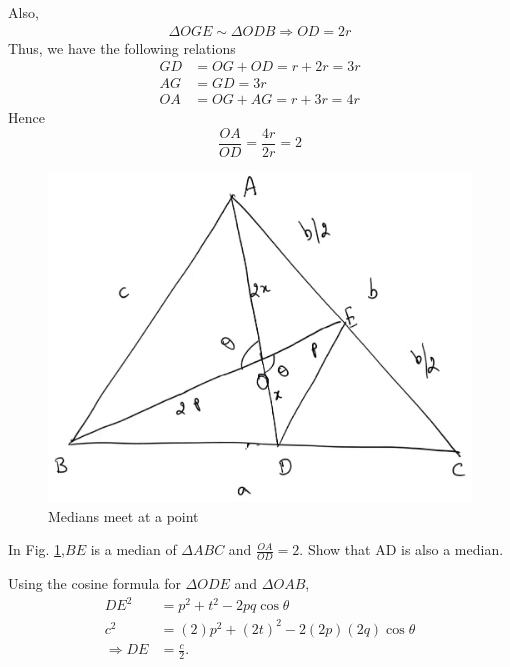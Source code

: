 %
Also,
\begin{align}
\Delta OGE \sim \Delta ODB \Rightarrow OD = 2r
\end{align}
Thus, we have the following relations
\begin{align}
GD &= OG + OD  = r + 2r = 3r\\
AG &= GD = 3r\\
OA &= OG + AG = r + 3r = 4r
\end{align}
Hence
%
\begin{equation}
\frac{OA}{OD} = \frac{4r}{2r} = 2
\end{equation}
%
%
\begin{figure}[!h]
	\begin{center}
		
		\includegraphics[width=\columnwidth]{./figs/ch2_median_final}
		\vspace*{-10cm}
	\end{center}
	\caption{Medians meet at a point}
	\label{ch2_median_final}	
\end{figure}
%
\begin{problem}
	In Fig. \ref{ch2_median_final},$BE$ is a median of $\Delta ABC$ and $\frac{OA}{OD} = 2$.  Show that AD is also a median. 
\end{problem}
\proof Using the cosine formula for $\Delta ODE$ and $\Delta OAB$, 
\begin{align}
DE^2 &= p^2 + t^2 -2pq\cos \theta \\
c^2 & = (2)p^2 + (2t)^2 -2(2p)(2q)\cos \theta \\
\Rightarrow DE &= \frac{c}{2}.
\end{align}
